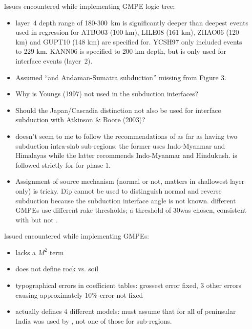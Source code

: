 \documentclass{article}
\begin{document}
Issues encountered while implementing GMPE logic tree:
\begin{itemize}
\item layer~4 depth range of 180-300~km is significantly deeper than deepest events used in regression for ATBO03 (100 km), LILE08 (161 km), ZHAO06 (120 km) and GUPT10 (148 km) are specified for. YCSH97 only included events to 229 km. KANN06 is specified to 200 km depth, but is only used for interface events (layer~2).
\item Assumed “and Andaman-Sumatra subduction” missing from Figure 3.
\item Why is Youngs (1997) not used in the subduction interfaces?
\item Should the Japan/Cascadia distinction not also be used for interface subduction with Atkinson \& Boore (2003)?
\item \cite{nath2012probabilistic} doesn't seem to me to follow the recommendations of \cite{nath2011peak} as far as having two subduction intra-slab sub-regions: the former uses Indo-Myanmar and Himalayas while the latter recommends Indo-Myanmar and Hindukush. \cite{nath2012probabilistic} is followed strictly for for phase 1.
\item Assignment of source mechanism (normal or not, matters in shallowest layer only) is tricky.  Dip cannot be used to distinguish normal and reverse subduction because the subduction interface angle is not known. different GMPEs use different rake thresholds; a threshold of 30\degree\space was chosen, consistent with \cite{boore2008ground, campbell2008nga} but not \cite{zhao2006attenuation}.
\end{itemize}

Issued encountered while implementing GMPEs:

\cite{sharma2009ground}
\begin{itemize}
\item lacks a $M^2$ term \cite{cotton2006criteria}
\item does not define rock vs. soil
\end{itemize}

\cite{raghukanth2007estimation}
\begin{itemize}
\item typographical errors in coefficient tables: grossest error fixed, 3 other errors causing approximately 10\% error not fixed
\item actually defines 4 different models: must assume that for all of peninsular India was used by \cite{nath2012probabilistic}, not one of those for sub-regions.
\end{itemize}
\end{document}
